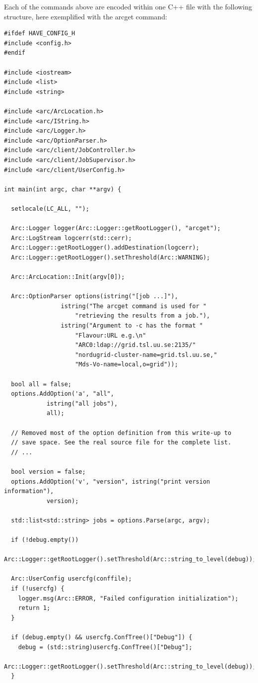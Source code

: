 \documentclass{book}
\begin{document}
Each of the commands above are encoded within one C++ file with the
following structure, here exemplified with the arcget command:

\begin{shaded}
\begin{verbatim}
#ifdef HAVE_CONFIG_H
#include <config.h>
#endif

#include <iostream>
#include <list>
#include <string>

#include <arc/ArcLocation.h>
#include <arc/IString.h>
#include <arc/Logger.h>
#include <arc/OptionParser.h>
#include <arc/client/JobController.h>
#include <arc/client/JobSupervisor.h>
#include <arc/client/UserConfig.h>

int main(int argc, char **argv) {

  setlocale(LC_ALL, "");

  Arc::Logger logger(Arc::Logger::getRootLogger(), "arcget");
  Arc::LogStream logcerr(std::cerr);
  Arc::Logger::getRootLogger().addDestination(logcerr);
  Arc::Logger::getRootLogger().setThreshold(Arc::WARNING);

  Arc::ArcLocation::Init(argv[0]);

  Arc::OptionParser options(istring("[job ...]"),
			    istring("The arcget command is used for "
				    "retrieving the results from a job."),
			    istring("Argument to -c has the format "
				    "Flavour:URL e.g.\n"
				    "ARC0:ldap://grid.tsl.uu.se:2135/"
				    "nordugrid-cluster-name=grid.tsl.uu.se,"
				    "Mds-Vo-name=local,o=grid"));

  bool all = false;
  options.AddOption('a', "all",
		    istring("all jobs"),
		    all);

  // Removed most of the option definition from this write-up to
  // save space. See the real source file for the complete list.
  // ...

  bool version = false;
  options.AddOption('v', "version", istring("print version information"),
		    version);

  std::list<std::string> jobs = options.Parse(argc, argv);

  if (!debug.empty())
    Arc::Logger::getRootLogger().setThreshold(Arc::string_to_level(debug));

  Arc::UserConfig usercfg(conffile);
  if (!usercfg) {
    logger.msg(Arc::ERROR, "Failed configuration initialization");
    return 1;
  }

  if (debug.empty() && usercfg.ConfTree()["Debug"]) {
    debug = (std::string)usercfg.ConfTree()["Debug"];
    Arc::Logger::getRootLogger().setThreshold(Arc::string_to_level(debug));
  }


\end{verbatim}
\end{shaded}
\end{document}
